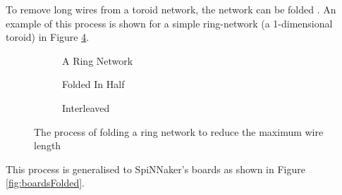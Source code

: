 			To remove long wires from a toroid network, the network can be folded
			\cite{dally04}. An example of this process is shown for a simple
			ring-network (a 1-dimensional toroid) in Figure \ref{fig:folding}.
			
			\begin{figure}
				\begin{subfigure}[b]{\textwidth}
					\center
					
					\caption{A Ring Network}
					\label{fig:ringLong}
				\end{subfigure}
				
				\vspace{2ex}
				
				\begin{subfigure}[b]{\textwidth}
					\center
					
					\caption{Folded In Half}
					\label{fig:ringFolded}
				\end{subfigure}
				
				\vspace{2ex}
				
				\begin{subfigure}[b]{\textwidth}
					\center
					
					\caption{Interleaved}
					\label{fig:ringInterleaved}
				\end{subfigure}
				
				\caption[Folding a ring network to reduce the maximum wire length]{The
				process of folding a ring network to reduce the maximum wire length}
				\label{fig:folding}
			\end{figure}
			
			This process is generalised to SpiNNaker's boards as shown in Figure
			\ref{fig:boardsFolded}.
			
